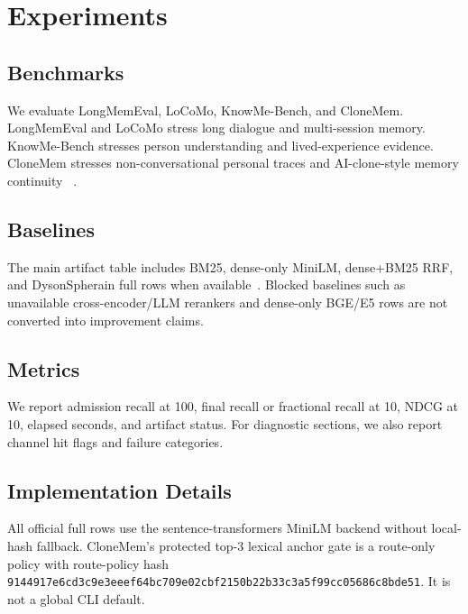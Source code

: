 \documentclass[10pt]{article}
\newcommand{\system}{DysonSpherain}
\newcommand{\artifact}[1]{\texttt{\small #1}}
\begin{document}
\begin{table}[t]
  \centering
  \caption{Artifact validation coverage. Data source:
  \artifact{artifacts/formal\_protocol\_validation.json}.}
  \label{tab:artifact-validation}
  
\end{table}

\section{Experiments}

\subsection{Benchmarks}

We evaluate LongMemEval, LoCoMo, KnowMe-Bench, and CloneMem. LongMemEval and
LoCoMo stress long dialogue and multi-session memory. KnowMe-Bench stresses
person understanding and lived-experience evidence. CloneMem stresses
non-conversational personal traces and AI-clone-style memory continuity
~\cite{wu2024longmemeval,maharana2024locomo,wu2026knowme,hu2026clonemem}.

\subsection{Baselines}

The main artifact table includes BM25, dense-only MiniLM, dense+BM25 RRF, and
\system{} full rows when available~\cite{robertson2009probabilistic,reimers2019sentencebert,cormack2009rrf}.
Blocked baselines such as unavailable cross-encoder/LLM rerankers and
dense-only BGE/E5 rows are not converted into improvement claims.

\subsection{Metrics}

We report admission recall at 100, final recall or fractional recall at 10,
NDCG at 10, elapsed seconds, and artifact status. For diagnostic sections, we
also report channel hit flags and failure categories.

\subsection{Implementation Details}

All official full rows use the sentence-transformers MiniLM backend without
local-hash fallback. CloneMem's protected top-3 lexical anchor gate is a
route-only policy with route-policy hash
\texttt{9144917e6cd3c9e3eeef64bc709e02cbf2150b22b33c3a5f99cc05686c8bde51}.
It is not a global CLI default.
\end{document}
